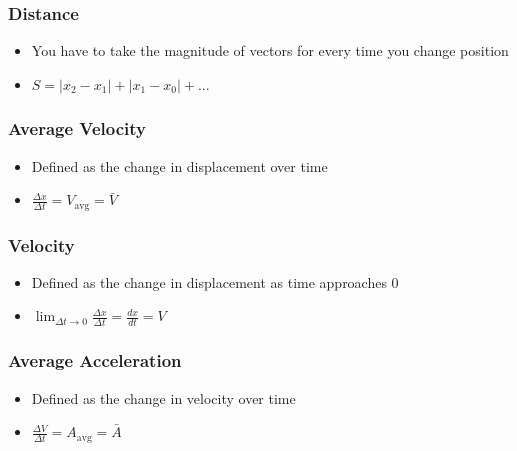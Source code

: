 \documentclass[
  letterpaper,
  DIV=11,
  numbers=noendperiod]{scrartcl}
\providecommand{\tightlist}{%
  \setlength{\itemsep}{0pt}\setlength{\parskip}{0pt}}\usepackage{longtable,booktabs,array}
\begin{document}
\hypertarget{distance}{%
\subsubsection{Distance}\label{distance}}

\begin{itemize}
\tightlist
\item
  You have to take the magnitude of vectors for every time you change
  position
\item
  \(S = |x_2 - x_1| + |x_1 - x_0| + ...\)
\end{itemize}

\hypertarget{average-velocity}{%
\subsubsection{Average Velocity}\label{average-velocity}}

\begin{itemize}
\tightlist
\item
  Defined as the change in displacement over time
\item
  \(\frac{\Delta x}{\Delta t} = V_\text{avg} = \bar{V}\)
\end{itemize}

\hypertarget{velocity}{%
\subsubsection{Velocity}\label{velocity}}

\begin{itemize}
\tightlist
\item
  Defined as the change in displacement as time approaches 0
\item
  \(\lim_{\Delta t \to 0} \frac{\Delta x}{\Delta t} = \frac{dx}{dt} = V\)
\end{itemize}

\hypertarget{average-acceleration}{%
\subsubsection{Average Acceleration}\label{average-acceleration}}

\begin{itemize}
\tightlist
\item
  Defined as the change in velocity over time
\item
  \(\frac{\Delta V}{\Delta t} = A_\text{avg} = \bar{A}\)
\end{itemize}
\end{document}
